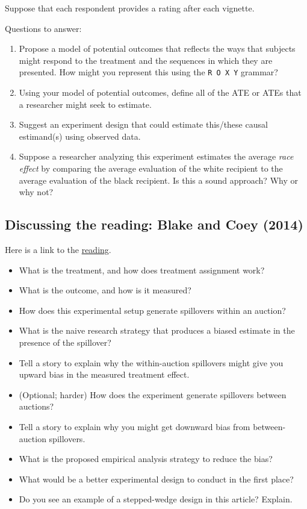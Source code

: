 \documentclass[
]{article}
\providecommand{\tightlist}{%
  \setlength{\itemsep}{0pt}\setlength{\parskip}{0pt}}
\theoremstyle{definition}
\theoremstyle{definition}
\theoremstyle{definition}
\theoremstyle{definition}
\theoremstyle{remark}
\begin{document}
Suppose that each respondent provides a rating after each vignette.

Questions to answer:

\begin{enumerate}
\def\labelenumi{\arabic{enumi}.}
\tightlist
\item
  Propose a model of potential outcomes that reflects the ways that subjects might respond to the treatment and the sequences in which they are presented. How might you represent this using the \texttt{R\ O\ X\ Y} grammar?
\item
  Using your model of potential outcomes, define all of the ATE or ATEs that a researcher might seek to estimate.
\item
  Suggest an experiment design that could estimate this/these causal estimand(s) using observed data.
\item
  Suppose a researcher analyzing this experiment estimates the average \emph{race effect} by comparing the average evaluation of the white recipient to the average evaluation of the black recipient. Is this a sound approach? Why or why not?
\end{enumerate}

\subsection{Discussing the reading: Blake and Coey (2014)}\label{discussing-the-reading-blake-and-coey-2014}

Here is a link to the \href{https://github.com/UC-Berkeley-I-School/mids-w241/blob/main/readings/Blake.2014.pdf}{reading}.

\begin{itemize}
\item
  What is the treatment, and how does treatment assignment work?
\item
  What is the outcome, and how is it measured?
\item
  How does this experimental setup generate spillovers within an auction?
\item
  What is the naive research strategy that produces a biased estimate in the presence of the spillover?
\item
  Tell a story to explain why the within-auction spillovers might give you upward bias in the measured treatment effect.
\item
  (Optional; harder) How does the experiment generate spillovers between auctions?
\item
  Tell a story to explain why you might get downward bias from between-auction spillovers.
\item
  What is the proposed empirical analysis strategy to reduce the bias?
\item
  What would be a better experimental design to conduct in the first place?
\item
  Do you see an example of a stepped-wedge design in this article? Explain.
\end{itemize}
\end{document}
